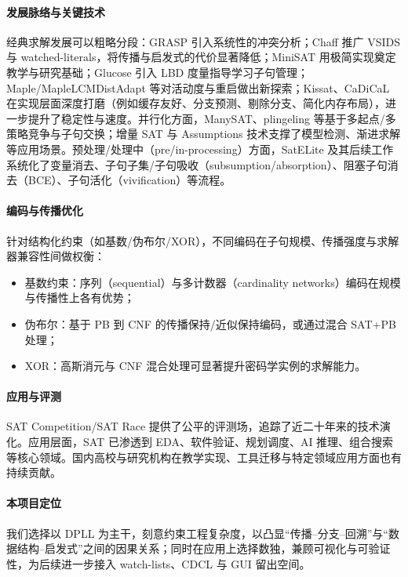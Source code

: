 \documentclass[UTF8]{ctexart}
\begin{document}
\paragraph{发展脉络与关键技术} 经典求解发展可以粗略分段：GRASP 引入系统性的冲突分析；Chaff 推广 VSIDS 与 watched-literals，将传播与启发式的代价显著降低；MiniSAT 用极简实现奠定教学与研究基础；Glucose 引入 LBD 度量指导学习子句管理；Maple/MapleLCMDistAdapt 等对活动度与重启做出新探索；Kissat、CaDiCaL 在实现层面深度打磨（例如缓存友好、分支预测、剔除分支、简化内存布局），进一步提升了稳定性与速度。并行化方面，ManySAT、plingeling 等基于多起点/多策略竞争与子句交换；增量 SAT 与 Assumptions 技术支撑了模型检测、渐进求解等应用场景。预处理/处理中（pre/in-processing）方面，SatELite 及其后续工作系统化了变量消去、子句子集/子句吸收（subsumption/absorption）、阻塞子句消去（BCE）、子句活化（vivification）等流程。

\paragraph{编码与传播优化} 针对结构化约束（如基数/伪布尔/XOR），不同编码在子句规模、传播强度与求解器兼容性间做权衡：
\begin{itemize}
  \item 基数约束：序列（sequential）与多计数器（cardinality networks）编码在规模与传播性上各有优势；
  \item 伪布尔：基于 PB 到 CNF 的传播保持/近似保持编码，或通过混合 SAT+PB 处理；
  \item XOR：高斯消元与 CNF 混合处理可显著提升密码学实例的求解能力。
\end{itemize}

\paragraph{应用与评测} SAT Competition/SAT Race 提供了公平的评测场，追踪了近二十年来的技术演化。应用层面，SAT 已渗透到 EDA、软件验证、规划调度、AI 推理、组合搜索等核心领域。国内高校与研究机构在教学实现、工具迁移与特定领域应用方面也有持续贡献。

\paragraph{本项目定位} 我们选择以 DPLL 为主干，刻意约束工程复杂度，以凸显“传播--分支--回溯”与“数据结构--启发式”之间的因果关系；同时在应用上选择数独，兼顾可视化与可验证性，为后续进一步接入 watch-lists、CDCL 与 GUI 留出空间。
\end{document}
